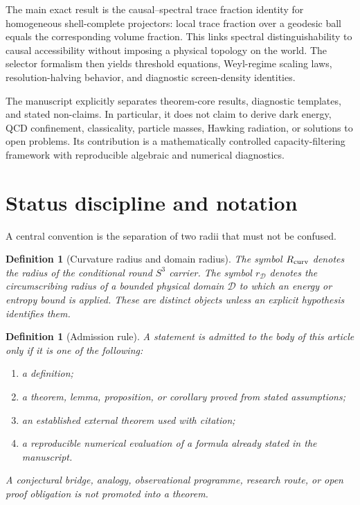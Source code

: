 \documentclass[11pt,a4paper]{article}
\newtheorem{definition}[theorem]{Definition}
\begin{document}
The main exact result is the causal--spectral trace fraction identity for homogeneous shell-complete projectors: local trace fraction over a geodesic ball equals the corresponding volume fraction.  This links spectral distinguishability to causal accessibility without imposing a physical topology on the world.  The selector formalism then yields threshold equations, Weyl-regime scaling laws, resolution-halving behavior, and diagnostic screen-density identities.

The manuscript explicitly separates theorem-core results, diagnostic templates, and stated non-claims.  In particular, it does not claim to derive dark energy, QCD confinement, classicality, particle masses, Hawking radiation, or solutions to open problems.  Its contribution is a mathematically controlled capacity-filtering framework with reproducible algebraic and numerical diagnostics.

\section{Status discipline and notation}

A central convention is the separation of two radii that must not be confused.

\begin{definition}[Curvature radius and domain radius]
The symbol $R_{\rm curv}$ denotes the radius of the conditional round $S^3$ carrier.  The symbol $r_{\mathcal D}$ denotes the circumscribing radius of a bounded physical domain $\mathcal D$ to which an energy or entropy bound is applied.  These are distinct objects unless an explicit hypothesis identifies them.
\end{definition}

\begin{definition}[Admission rule]
A statement is admitted to the body of this article only if it is one of the following:
\begin{enumerate}
\item a definition;
\item a theorem, lemma, proposition, or corollary proved from stated assumptions;
\item an established external theorem used with citation;
\item a reproducible numerical evaluation of a formula already stated in the manuscript.
\end{enumerate}
A conjectural bridge, analogy, observational programme, research route, or open proof obligation is not promoted into a theorem.
\end{definition}
\end{document}
